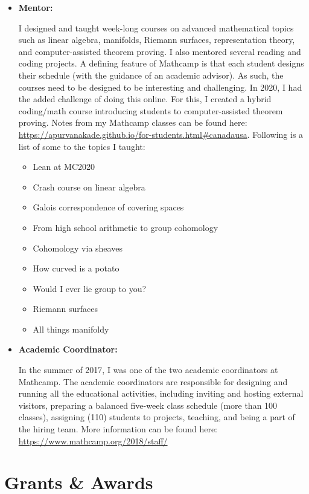 \documentclass[
]{report}
\providecommand{\tightlist}{%
  \setlength{\itemsep}{0pt}\setlength{\parskip}{0pt}}
\begin{document}
\begin{itemize}
\item
  \textbf{Mentor:}

  I designed and taught week-long courses on advanced mathematical topics such as linear algebra, manifolds, Riemann surfaces, representation theory, and computer-assisted theorem proving. I also mentored several reading and coding projects. A defining feature of Mathcamp is that each student designs their schedule (with the guidance of an academic advisor). As such, the courses need to be designed to be interesting and challenging. In 2020, I had the added challenge of doing this online. For this, I created a hybrid coding/math course introducing students to computer-assisted theorem proving.
  Notes from my Mathcamp classes can be found here: \url{https://apurvanakade.github.io/for-students.html\#canadausa}.
  Following is a list of some to the topics I taught:

  \begin{itemize}
  \tightlist
  \item
    Lean at MC2020
  \item
    Crash course on linear algebra
  \item
    Galois correspondence of covering spaces
  \item
    From high school arithmetic to group cohomology
  \item
    Cohomology via sheaves
  \item
    How curved is a potato
  \item
    Would I ever lie group to you?
  \item
    Riemann surfaces
  \item
    All things manifoldy
  \end{itemize}
\item
  \textbf{Academic Coordinator:}

  In the summer of 2017, I was one of the two academic coordinators at Mathcamp.
  The academic coordinators are responsible for designing and running all the educational activities, including inviting and hosting external visitors, preparing a balanced five-week class schedule (more than 100 classes), assigning (110) students to projects, teaching, and being a part of the hiring team.
  More information can be found here: \url{https://www.mathcamp.org/2018/staff/}
\end{itemize}

\hypertarget{grants-awards}{%
\chapter{Grants \& Awards}\label{grants-awards}}
\end{document}
